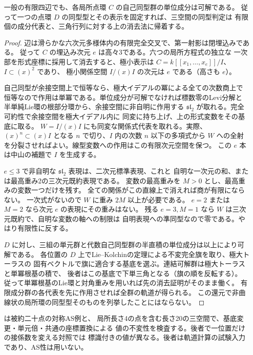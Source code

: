 \begin{proposition}\label{prop:finite-point-aut-solvable}
一般の有限四辺でも、各局所点環 $C$ の自己同型群の単位成分は可解である。
従って一つの点環 $D$ の同型型とその表示を固定すれば、三空間の同型判定は
有限個の成分代表と、三角行列に対する上の消去法に帰着する。
\end{proposition}
\begin{proof}
辺は滑らかな六次元多様体内の有限完全交叉で、第一射影は閉埋込みである。
従って $C$ の埋込み次元 $e$ は高々3である。六つの局所方程式の独立な
一次部を形式座標に採用して消去すると、極小表示は
$C=k[[x_1,\ldots,x_e]]/I$、$I\subset (x)^2$ であり、
極小関係空間 $I/(x)I$ の次元は $e$ である（高さも $e$）。

自己同型が余接空間上で恒等なら、極大イデアルの冪による全ての次数商上で
恒等なので作用は単冪である。単位成分が可解でなければ標数零のLevi分解と
半単純Lie環の根部分環から、余接空間に非自明に作用する
$\mathfrak{sl}_2$ が取れる。完全可約性で余接空間を極大イデアル内に
同変に持ち上げ、上の形式変数をその基底に取る。
$W=I/(x)I$ にも同変な関係式代表を取れる。実際、
$(x)^n\subset (x)I$ となる $n$ で切り、$I$ 内の次数 $n$ 以下の多項式から
$W$ への全射を分裂させればよい。線型変数への作用はこの有限次元空間を保つ。
この $e$ 本は中山の補題で $I$ を生成する。

$e\le3$ で非自明な $\mathfrak{sl}_2$ 表現は、二次元標準表現、これと
自明な一次元の和、または最高重み2の三次元既約表現である。
変数の最高重みを $M>0$ とし、最高重みの変数一つだけを残す。
全ての関係がこの直線上で消えれば商が有限にならない。
一次式がないので $W$ に重み $2M$ 以上が必要である。
$e=2$ または $M=2$ なら次元 $e$ の表現にその重みはない。
残る $e=3,M=1$ なら $W$ は三次元既約で、自明な変数の軸への制限は
自明表現への準同型なので零である。やはり有限性に反する。

$D$ に対し、三組の単元群と代数自己同型群の半直積の単位成分は以上により可解である。
各位置の $D$ 上でLie--Kolchinの定理による不変完全旗を取り、極大トーラスの
固有ベクトルで旗に適合する基底を選ぶ。連結可解群は極大トーラスと単冪根基の積で、
後者はこの基底で下単三角となる（旗の順を反転する）。
従って単冪根基のLie環と対角重みを用いれば先の消去証明がそのまま働く。
有限成分群の各代表を先に作用させれば全群の軌道が得られる。
この還元で非曲線状の局所環の同型型そのものを列挙したことにはならない。
\end{proof}

 は被約二十点の対称AS例と、
局所長さ4の点を含む長さ20の三空間で、基底変更・単元倍・共通の座標置換による
値の不変性を検査する。後者で一位置だけの接係数を変える対照では
標識付きの値が異なる。後者は軌道計算の試験入力であり、AS性は用いない。
